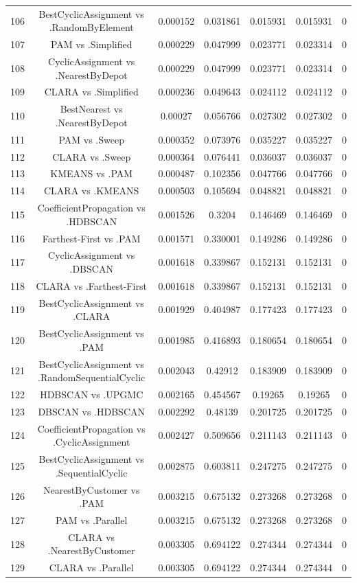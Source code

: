 \documentclass[a4paper,10pt]{article}
\begin{document}
\begin{landscape}
\begin{table}[!htp]
\begin{tabular}{ccccccc}
106&BestCyclicAssignment vs .RandomByElement&0.000152&0.031861&0.015931&0.015931&0\\
107&PAM vs .Simplified&0.000229&0.047999&0.023771&0.023314&0\\
108&CyclicAssignment vs .NearestByDepot&0.000229&0.047999&0.023771&0.023314&0\\
109&CLARA vs .Simplified&0.000236&0.049643&0.024112&0.024112&0\\
110&BestNearest vs .NearestByDepot&0.00027&0.056766&0.027302&0.027302&0\\
111&PAM vs .Sweep&0.000352&0.073976&0.035227&0.035227&0\\
112&CLARA vs .Sweep&0.000364&0.076441&0.036037&0.036037&0\\
113&KMEANS vs .PAM&0.000487&0.102356&0.047766&0.047766&0\\
114&CLARA vs .KMEANS&0.000503&0.105694&0.048821&0.048821&0\\
115&CoefficientPropagation vs .HDBSCAN&0.001526&0.3204&0.146469&0.146469&0\\
116&Farthest-First vs .PAM&0.001571&0.330001&0.149286&0.149286&0\\
117&CyclicAssignment vs .DBSCAN&0.001618&0.339867&0.152131&0.152131&0\\
118&CLARA vs .Farthest-First&0.001618&0.339867&0.152131&0.152131&0\\
119&BestCyclicAssignment vs .CLARA&0.001929&0.404987&0.177423&0.177423&0\\
120&BestCyclicAssignment vs .PAM&0.001985&0.416893&0.180654&0.180654&0\\
121&BestCyclicAssignment vs .RandomSequentialCyclic&0.002043&0.42912&0.183909&0.183909&0\\
122&HDBSCAN vs .UPGMC&0.002165&0.454567&0.19265&0.19265&0\\
123&DBSCAN vs .HDBSCAN&0.002292&0.48139&0.201725&0.201725&0\\
124&CoefficientPropagation vs .CyclicAssignment&0.002427&0.509656&0.211143&0.211143&0\\
125&BestCyclicAssignment vs .SequentialCyclic&0.002875&0.603811&0.247275&0.247275&0\\
126&NearestByCustomer vs .PAM&0.003215&0.675132&0.273268&0.273268&0\\
127&PAM vs .Parallel&0.003215&0.675132&0.273268&0.273268&0\\
128&CLARA vs .NearestByCustomer&0.003305&0.694122&0.274344&0.274344&0\\
129&CLARA vs .Parallel&0.003305&0.694122&0.274344&0.274344&0\\

\end{tabular}
\end{table}
\end{landscape}
\end{document}
